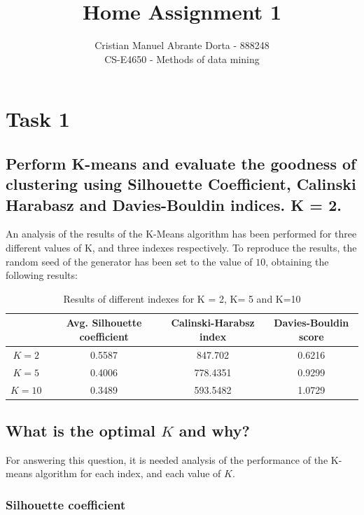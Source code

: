 \documentclass[12pt]{article}
\begin{document}
 
\title{Home Assignment 1}
\author{Cristian Manuel Abrante Dorta - 888248\\
CS-E4650 - Methods of data mining}

\maketitle
\section{Task 1}
\label{sec:task-1}

\subsection{Perform K-means and evaluate the goodness of clustering using
Silhouette Coefficient, Calinski Harabasz and Davies-Bouldin indices.
K = 2.}

An analysis of the results of the K-Means algorithm has been performed for three different values of K, and three indexes respectively. To reproduce the results, the random seed of the generator has been set to the value of $10$, obtaining the following results:

\begin{table}[h]
\centering
\begin{tabular}{c|ccc}
       & Avg. Silhouette coefficient & Calinski-Harabsz index & Davies-Bouldin score \\ \hline
$K = 2$  & 0.5587                 & 847.702                & 0.6216               \\
$K = 5$  & 0.4006                 & 778.4351               & 0.9299               \\
$K = 10$ & 0.3489                 & 593.5482               & 1.0729              \\

\end{tabular}
\caption{Results of different indexes for K = 2, K= 5 and K=10}
\label{tab:coefs}
\end{table}

\subsection{What is the optimal $K$ and why?}

For answering this question, it is needed analysis of the performance of the K-means algorithm for each index, and each value of $K$.

\subsubsection{Silhouette coefficient}
\end{document}
